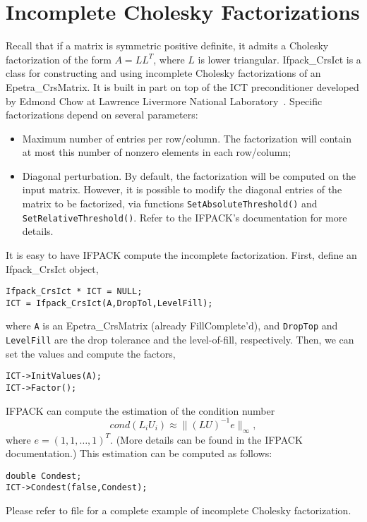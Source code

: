 
\section{Incomplete Cholesky Factorizations}
\label{sec:ifpack_chol}

Recall that if a matrix is symmetric positive definite, it admits a Cholesky
factorization of the form $A=LL^T$, where $L$ is lower triangular.
Ifpack\_CrsIct is a class for constructing and using incomplete Cholesky
factorizations of an Epetra\_CrsMatrix. It is built in part on top of the ICT
preconditioner developed by Edmond Chow at Lawrence Livermore National
Laboratory~\cite{ChowICT}.  Specific factorizations depend on several parameters:
\begin{itemize}
\item Maximum number of entries per row/column. The factorization
  will contain at most this number of nonzero elements in each
  row/column;
\item Diagonal perturbation.  By default, the factorization will be
  computed on the input matrix. However, it is possible to modify the
  diagonal entries of the matrix to be factorized, via functions
  \verb!SetAbsoluteThreshold()! and \verb!SetRelativeThreshold()!. Refer
  to the IFPACK's documentation for more details.
\end{itemize}

It is easy to have IFPACK compute the incomplete factorization. First, define
an Ifpack\_CrsIct object,
\begin{verbatim}
Ifpack_CrsIct * ICT = NULL;
ICT = Ifpack_CrsIct(A,DropTol,LevelFill);
\end{verbatim}
where \verb!A! is an Epetra\_CrsMatrix (already FillComplete'd), and
\verb!DropTop! and \verb!LevelFill! are the drop tolerance and the
level-of-fill, respectively. Then, we can set the values and compute the
factors,
\begin{verbatim}
ICT->InitValues(A);
ICT->Factor();
\end{verbatim}

IFPACK can compute the estimation of the condition number
\[
cond(L_i U_i) \approx \|(LU)^{-1} e \|_\infty ,
\]
where $e = (1,1,\dots,1)^T$. (More details can be found in the IFPACK
documentation.) This estimation can be computed as follows:
\begin{verbatim}
double Condest;
ICT->Condest(false,Condest);
\end{verbatim}
Please refer to file  for a complete example of
incomplete Cholesky factorization.

